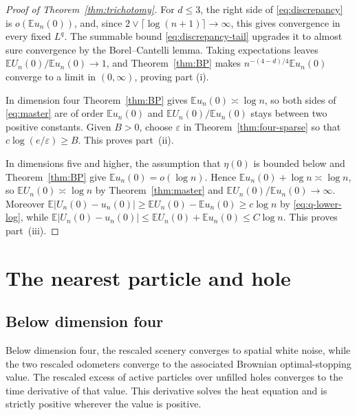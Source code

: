 \documentclass[11pt]{amsart}
\theoremstyle{plain}
\theoremstyle{definition}
\newcommand{\E}{\mathbb{E}}
\newcommand{\eps}{\varepsilon}
\begin{document}
\begin{proof}[Proof of Theorem~\ref{thm:trichotomy}]
	For $d\leq3$, the right side of \eqref{eq:discrepancy} is $o(\E u_n(0))$,
	and, since $2\vee\lceil\log(n+1)\rceil\to\infty$, this gives convergence in
	every fixed $L^q$. The summable bound
	\eqref{eq:discrepancy-tail} upgrades it to almost sure convergence by the
	Borel--Cantelli lemma. Taking expectations leaves
	$\E U_n(0)/\E u_n(0)\to1$, and Theorem~\ref{thm:BP} makes
	$n^{-(4-d)/4}\E u_n(0)$ converge to a limit in $(0,\infty)$, proving part
	\textup{(i)}.

	In dimension four Theorem~\ref{thm:BP} gives $\E u_n(0)\asymp\log n$, so
	both sides of \eqref{eq:master} are of order $\E u_n(0)$ and
	$\E U_n(0)/\E u_n(0)$ stays between two positive constants. Given $B>0$,
	choose $\eps$ in Theorem~\ref{thm:four-sparse} so that
	$c\log(e/\eps)\geq B$. This proves
	part~\textup{(ii)}.

	In dimensions five and higher, the assumption that $\eta(0)$ is bounded
	below and Theorem~\ref{thm:BP} give $\E u_n(0)=o(\log n)$. Hence
	$\E u_n(0)+\log n\asymp\log n$, so
	$\E U_n(0)\asymp\log n$ by Theorem~\ref{thm:master} and
	$\E U_n(0)/\E u_n(0)\to\infty$. Moreover
	$\E|U_n(0)-u_n(0)|\geq\E U_n(0)-\E u_n(0)\geq c\log n$ by
	\eqref{eq:q-lower-log}, while
	$\E|U_n(0)-u_n(0)|\leq\E U_n(0)+\E u_n(0)\leq C\log n$.
	This proves part~\textup{(iii)}.
\end{proof}

\section{The nearest particle and hole}\label{sec:nearest}

\subsection{Below dimension four}

Below dimension four, the rescaled scenery converges to spatial white noise, while the two rescaled odometers converge to the associated Brownian optimal-stopping value. The
rescaled excess of active particles over unfilled holes converges to the time
derivative of that value. This derivative solves the heat equation and is
strictly positive wherever the value is positive.
\end{document}
